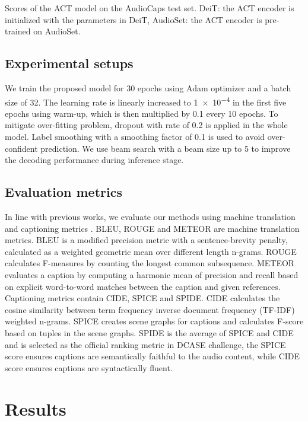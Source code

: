 \documentclass{article}
\begin{document}
\begin{sloppy}
\begin{table*}[ht]
\caption{Scores of the ACT model on the AudioCaps test set. DeiT: the ACT encoder is initialized with the parameters in DeiT, AudioSet: the ACT encoder is pre-trained on AudioSet.}
\label{table:tab_results} 
\end{table*}

\subsection{Experimental setups}
\label{ssec:exp_setup}
We train the proposed model for \num{30} epochs using Adam optimizer \cite{kingma2014adam} and a batch size of \num{32}. The learning rate is linearly increased to \num{1e-4} in the first five epochs using warm-up, which is then multiplied by \num{0.1} every \num{10} epochs. To mitigate over-fitting problem, dropout with rate of \num{0.2} is applied in the whole model. Label smoothing \cite{szegedy2016labelsmoothing} with a smoothing factor of \num{0.1} is used to avoid over-confident prediction. We use beam search with a beam size up to \num{5} to improve the decoding performance during inference stage.

\subsection{Evaluation metrics}
\label{ssec:metrics}


In line with previous works, we evaluate our methods using machine translation and captioning metrics \cite{tran2020wavetransformer}. BLEU, ROUGE and METEOR are machine translation metrics. BLEU is a modified precision metric with a sentence-brevity penalty, calculated as a weighted geometric mean over different length n-grams. ROUGE calculates F-measures by counting the longest common subsequence. METEOR evaluates a caption by computing a harmonic mean of precision and recall based on explicit word-to-word matches between the caption and given references. Captioning metrics contain CIDE, SPICE and SPIDE. CIDE calculates the cosine similarity between term frequency inverse document frequency (TF-IDF) weighted n-grams. SPICE creates scene graphs for captions and calculates F-score based on tuples in the scene graphs. SPIDE is the average of SPICE and CIDE and is selected as the official ranking metric in DCASE challenge, the SPICE score ensures captions are semantically faithful to the audio content, while CIDE score ensures captions are syntactically fluent. 
\section{Results}
\label{sec:results}

\end{sloppy}
\end{document}
